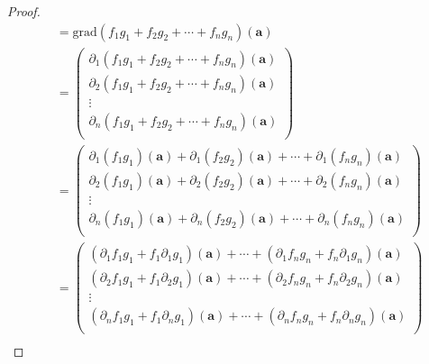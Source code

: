 \documentclass[dvipdfmx]{jsarticle}
\begin{document}
\begin{proof}
\begin{align*}
&= \mathrm{grad}\left( f_{1}g_{1} + f_{2}g_{2} + \cdots + f_{n}g_{n} \right)\left( \mathbf{a} \right)\\
&= \begin{pmatrix}
\partial_{1}\left( f_{1}g_{1} + f_{2}g_{2} + \cdots + f_{n}g_{n} \right)\left( \mathbf{a} \right) \\
\partial_{2}\left( f_{1}g_{1} + f_{2}g_{2} + \cdots + f_{n}g_{n} \right)\left( \mathbf{a} \right) \\
 \vdots \\
\partial_{n}\left( f_{1}g_{1} + f_{2}g_{2} + \cdots + f_{n}g_{n} \right)\left( \mathbf{a} \right) \\
\end{pmatrix}\\
&= \begin{pmatrix}
\partial_{1}\left( f_{1}g_{1} \right)\left( \mathbf{a} \right) + \partial_{1}\left( f_{2}g_{2} \right)\left( \mathbf{a} \right) + \cdots + \partial_{1}\left( f_{n}g_{n} \right)\left( \mathbf{a} \right) \\
\partial_{2}\left( f_{1}g_{1} \right)\left( \mathbf{a} \right) + \partial_{2}\left( f_{2}g_{2} \right)\left( \mathbf{a} \right) + \cdots + \partial_{2}\left( f_{n}g_{n} \right)\left( \mathbf{a} \right) \\
 \vdots \\
\partial_{n}\left( f_{1}g_{1} \right)\left( \mathbf{a} \right) + \partial_{n}\left( f_{2}g_{2} \right)\left( \mathbf{a} \right) + \cdots + \partial_{n}\left( f_{n}g_{n} \right)\left( \mathbf{a} \right) \\
\end{pmatrix}\\
&= \begin{pmatrix}
\left( \partial_{1}f_{1}g_{1} + f_{1}\partial_{1}g_{1} \right)\left( \mathbf{a} \right) + \cdots + \left( \partial_{1}f_{n}g_{n} + f_{n}\partial_{1}g_{n} \right)\left( \mathbf{a} \right) \\
\left( \partial_{2}f_{1}g_{1} + f_{1}\partial_{2}g_{1} \right)\left( \mathbf{a} \right) + \cdots + \left( \partial_{2}f_{n}g_{n} + f_{n}\partial_{2}g_{n} \right)\left( \mathbf{a} \right) \\
 \vdots \\
\left( \partial_{n}f_{1}g_{1} + f_{1}\partial_{n}g_{1} \right)\left( \mathbf{a} \right) + \cdots + \left( \partial_{n}f_{n}g_{n} + f_{n}\partial_{n}g_{n} \right)\left( \mathbf{a} \right) \\
\end{pmatrix}\\

\end{align*}
\end{proof}
\end{document}
